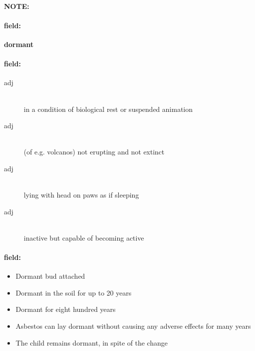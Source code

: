 \documentclass[12pt]{article}
\newenvironment{note}{\paragraph{NOTE:}}{}
\newenvironment{field}{\paragraph{field:}}{}
\begin{document}
\begin{note}
\begin{field}
\textbf{\large dormant}
\end{field}


\begin{field}
\begin{description}
\item[adj] \hfill \\ 
in a condition of biological rest or suspended animation

\item[adj] \hfill \\ 
(of e.g. volcanos) not erupting and not extinct

\item[adj] \hfill \\ 
lying with head on paws as if sleeping

\item[adj] \hfill \\ 
inactive but capable of becoming active

\end{description}
\end{field}

\begin{field}
\begin{itemize}
\item Dormant bud attached
\item Dormant in the soil for up to 20 years
\item Dormant for eight hundred years
\item Asbestos can lay dormant without causing any adverse effects for many years
\item The child remains dormant, in spite of the change
\end{itemize}
\end{field}
\end{note}
\end{document}

